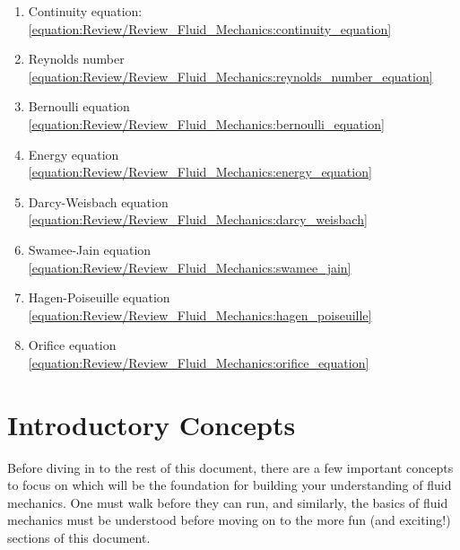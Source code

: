 \documentclass[letterpaper,10pt,english]{sphinxmanual}
\begin{document}
\begin{enumerate}
\item {} 
Continuity equation: \eqref{equation:Review/Review_Fluid_Mechanics:continuity_equation}

\item {} 
Reynolds number \eqref{equation:Review/Review_Fluid_Mechanics:reynolds_number_equation}

\item {} 
Bernoulli equation \eqref{equation:Review/Review_Fluid_Mechanics:bernoulli_equation}

\item {} 
Energy equation \eqref{equation:Review/Review_Fluid_Mechanics:energy_equation}

\item {} 
Darcy-Weisbach equation \eqref{equation:Review/Review_Fluid_Mechanics:darcy_weisbach}

\item {} 
Swamee-Jain equation \eqref{equation:Review/Review_Fluid_Mechanics:swamee_jain}

\item {} 
Hagen-Poiseuille equation \eqref{equation:Review/Review_Fluid_Mechanics:hagen_poiseuille}

\item {} 
Orifice equation \eqref{equation:Review/Review_Fluid_Mechanics:orifice_equation}

\end{enumerate}


\section{Introductory Concepts}
\label{\detokenize{Review/Review_Fluid_Mechanics:introductory-concepts}}\label{\detokenize{Review/Review_Fluid_Mechanics:heading-introductory-concepts}}
Before diving in to the rest of this document, there are a few important concepts to focus on which will be the foundation for building your understanding of fluid mechanics. One must walk before they can run, and similarly, the basics of fluid mechanics must be understood before moving on to the more fun (and exciting!) sections of this document.
\end{document}
